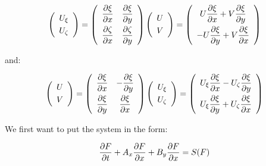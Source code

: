 \begin{equation*}
\left( 
\begin{array}{c}
U_{\xi } \smallskip\\ 
U_{\zeta }%
\end{array}
\right) =\left( 
\begin{array}{cc}
\dfrac{\partial \xi }{\partial x} & \dfrac{\partial \xi }{\partial y} \smallskip\\ 
\dfrac{\partial \zeta }{\partial x} & \dfrac{\partial \zeta }{\partial y}%
\end{array}
\right) \left( 
\begin{array}{c}
U \smallskip\\ 
V%
\end{array}
\right) =\left( 
\begin{array}{c}
U\dfrac{\partial \xi }{\partial x}+V\dfrac{\partial \xi }{\partial y} \smallskip\\ 
-U\dfrac{\partial \xi }{\partial y}+V\dfrac{\partial \xi }{\partial x}%
\end{array}
\right)
\end{equation*}

and:

\begin{equation*}
\left( 
\begin{array}{c}
U \smallskip\\ 
V%
\end{array}
\right) =\left( 
\begin{array}{cc}
\dfrac{\partial \xi }{\partial x} & -\dfrac{\partial \xi }{\partial y} \smallskip\\ 
\dfrac{\partial \xi }{\partial y} & \dfrac{\partial \xi }{\partial x}%
\end{array}
\right) \left( 
\begin{array}{c}
U_{\xi } \smallskip\\ 
U_{\zeta }%
\end{array}
\right) =\left( 
\begin{array}{c}
U_{\xi }\dfrac{\partial \xi }{\partial x}-U_{\zeta }\dfrac{\partial \xi }{%
\partial y} \smallskip\\ 
U_{\xi }\dfrac{\partial \xi }{\partial y}+U_{\zeta }\dfrac{\partial \xi }{%
\partial x}%
\end{array}
\right)
\end{equation*}

We first want to put the system in the form:

\begin{equation}
\dfrac{\partial F}{\partial t}+A_{x}\dfrac{\partial F}{\partial x}+B_{y}\dfrac{%
\partial F}{\partial x}=S(F)  \label{svtsyst}
\end{equation}

